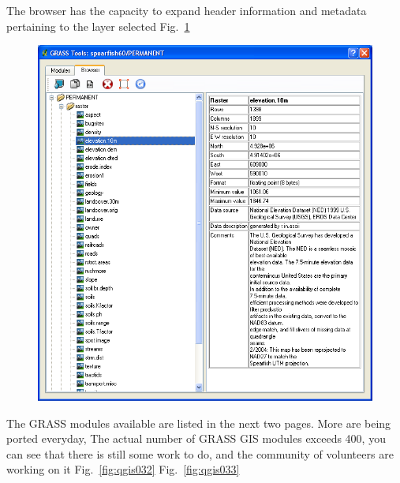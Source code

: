 The browser has the capacity to expand header information and metadata
pertaining to the layer selected Fig.~\ref{fig:qgis031}

\begin{figure}[htbp]
   \centering
   \includegraphics[scale=0.3]{qgis031.png}
   \caption{}
   \label{fig:qgis031}
\end{figure}

The GRASS modules available are listed in the next two pages. More are
being ported everyday, The actual number of GRASS GIS modules exceeds
400, you can see that there is still some work to do, and the community
of volunteers are working on it Fig.~\ref{fig:qgis032} Fig.~\ref{fig:qgis033}


